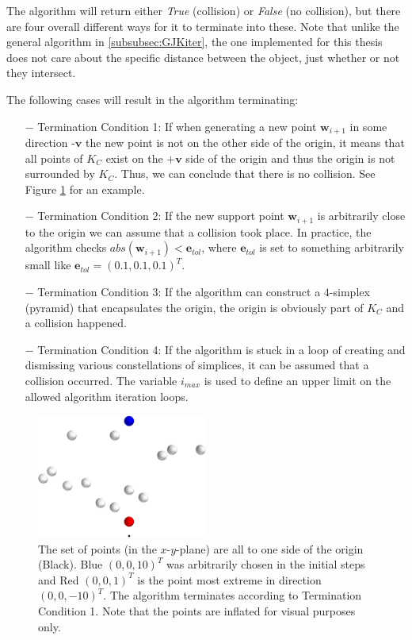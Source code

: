 The algorithm will return either \textit{True} (collision) or \textit{False} (no collision), but there are four overall different ways for it to terminate into these. Note that unlike the general algorithm in \ref{subsubsec:GJKiter}, the one implemented for this thesis does not care about the specific distance between the object, just whether or not they intersect.

The following cases will result in the algorithm terminating:

\begin{enumerate}
	\item[$-$] Termination Condition 1: If when generating a new point $\textbf{w}_{i+1}$ in some direction $\textbf{-v}$ the new point is not on the other side of the origin, it means that all points of $K_C$ exist on the $\textbf{+v}$ side of the origin and thus the origin is not surrounded by $K_C$. Thus, we can conclude that there is no collision. See Figure \ref{fig:GJK_TC1} for an example.
	\item[$-$] Termination Condition 2: If the new support point $\textbf{w}_{i+1}$ is arbitrarily close to the origin we can assume that a collision took place. In practice, the algorithm checks $abs(\textbf{w}_{i+1}) < \textbf{e}_{tol}$, where $\textbf{e}_{tol}$ is set to something arbitrarily small like $\textbf{e}_{tol} = (0.1, 0.1, 0.1)^T$. 
	\item[$-$] Termination Condition 3: If the algorithm can construct a $4$-simplex (pyramid) that encapsulates the origin, the origin is obviously part of $K_C$ and a collision happened.
	\item[$-$] Termination Condition 4: If the algorithm is stuck in a loop of creating and dismissing various constellations of simplices, it can be assumed that a collision occurred. The variable $i_{max}$ is used to define an upper limit on the allowed algorithm iteration loops. 
\end{enumerate}


\begin{figure}[h]
	\centering
	\includegraphics[width=0.5\textwidth]{import/GJK_TC1}
	\caption{The set of points (in the $x$-$y$-plane) are all to one side of the origin (Black). Blue $(0,0, 10)^T$ was arbitrarily chosen in the initial steps and Red $(0,0,1)^T$ is the point most extreme in direction $(0, 0, -10)^T$. The algorithm terminates according to Termination Condition 1. Note that the points are inflated for visual purposes only.}
	\label{fig:GJK_TC1}
\end{figure}


